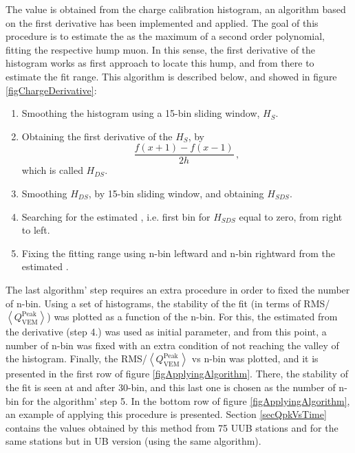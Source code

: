 \documentclass[twoside, final, 10pt]{articleMine}
\begin{document}
The \qpkvem value is obtained from the charge calibration
histogram, an algorithm based on the first derivative has been
implemented and applied. The goal of this procedure is to
estimate the \qpkvem as the maximum of a second order polynomial,
fitting the respective hump muon. In this sense, the first
derivative of the histogram works as first approach to locate
this hump, and from there to estimate the fit range. This
algorithm is described below, and showed in figure
\ref{figChargeDerivative}:

\begin{enumerate}
  \item Smoothing the histogram using a 15-bin sliding window,
    $H_S$.
  \item Obtaining the first derivative of the $H_S$, by
    \begin{equation}
      \frac{f(x+1)-f(x-1)}{2h} \, ,
    \end{equation}
    which is called $H_{DS}$.
  \item Smoothing $H_{DS}$, by 15-bin sliding window, and
    obtaining $H_{SDS}$.
  \item Searching for the estimated \qpkvem, i.e. first bin for
    $H_{SDS}$ equal to zero, from right to left.
  \item Fixing the fitting range using n-bin leftward and n-bin
    rightward from the estimated \qpkvem.
\end{enumerate}
The last algorithm' step requires an extra procedure in order to
fixed the number of n-bin. Using a set of histograms, the
stability of the fit (in terms of RMS/$\left<
Q^\mathrm{Peak}_\mathrm{VEM} \right>$) was plotted as a function
of the n-bin. For this, the estimated \qpkvem from the derivative
(step 4.) was used as initial parameter, and from this point, a
number of n-bin was fixed with an extra condition of not reaching
the valley of the histogram. Finally, the
RMS/$\left<Q^\mathrm{Peak}_\mathrm{VEM}\right>$ vs n-bin was
plotted, and it is presented in the first row of figure
\ref{figApplyingAlgorithm}. There, the stability of the fit
is seen at and after 30-bin, and this last one is chosen as the
number of n-bin for the algorithm' step 5. In the bottom row of
figure \ref{figApplyingAlgorithm}, an example of applying this
procedure is presented. Section \ref{secQpkVsTime} contains the
\qpkvem values obtained by this method from 75 UUB stations
and for the same stations but in UB version (using the same
algorithm).

\clearpage
\end{document}
